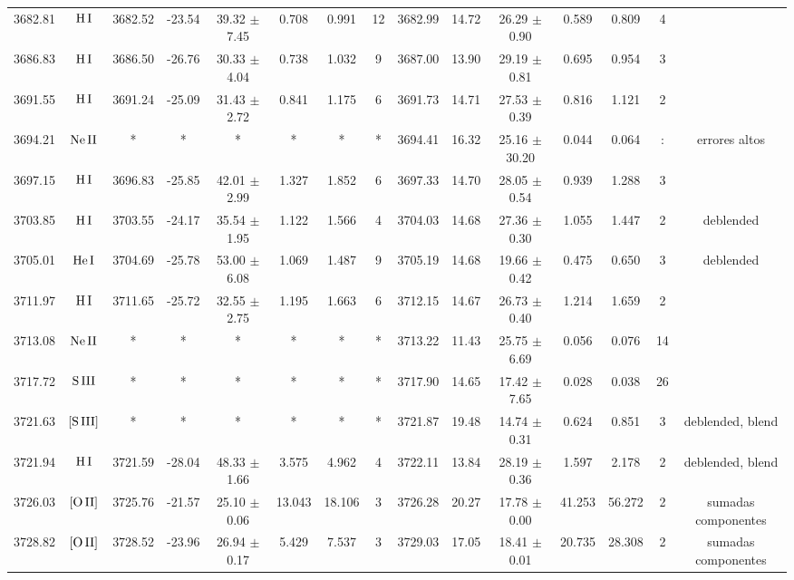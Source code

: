 \documentclass{article}
\begin{document}
\begin{table*}
\begin{adjustbox}{width=\textwidth}
\begin{tabular}{ccccccccccccccc}
3682.81 & $\mbox{H}\thinspace \mbox{I}$ & 3682.52 & -23.54 & 39.32 $\pm$ 7.45 & 0.708 & 0.991 & 12 & 3682.99 & 14.72 & 26.29 $\pm$ 0.90 & 0.589 & 0.809 & 4 &  \\
3686.83 & $\mbox{H}\thinspace \mbox{I}$ & 3686.50 & -26.76 & 30.33 $\pm$ 4.04 & 0.738 & 1.032 & 9 & 3687.00 & 13.90 & 29.19 $\pm$ 0.81 & 0.695 & 0.954 & 3 &  \\
3691.55 & $\mbox{H}\thinspace \mbox{I}$ & 3691.24 & -25.09 & 31.43 $\pm$ 2.72 & 0.841 & 1.175 & 6 & 3691.73 & 14.71 & 27.53 $\pm$ 0.39 & 0.816 & 1.121 & 2 &  \\
3694.21 & $\mbox{Ne}\thinspace \mbox{II}$ & * & * & * & * & * & * & 3694.41 & 16.32 & 25.16 $\pm$ 30.20 & 0.044 & 0.064 & : &  errores altos \\
3697.15 & $\mbox{H}\thinspace \mbox{I}$ & 3696.83 & -25.85 & 42.01 $\pm$ 2.99 & 1.327 & 1.852 & 6 & 3697.33 & 14.70 & 28.05 $\pm$ 0.54 & 0.939 & 1.288 & 3 &  \\
3703.85 & $\mbox{H}\thinspace \mbox{I}$ & 3703.55 & -24.17 & 35.54 $\pm$ 1.95 & 1.122 & 1.566 & 4 & 3704.03 & 14.68 & 27.36 $\pm$ 0.30 & 1.055 & 1.447 & 2 &  deblended \\
3705.01 & $\mbox{He}\thinspace \mbox{I}$ & 3704.69 & -25.78 & 53.00 $\pm$ 6.08 & 1.069 & 1.487 & 9 & 3705.19 & 14.68 & 19.66 $\pm$ 0.42 & 0.475 & 0.650 & 3 &  deblended \\
3711.97 & $\mbox{H}\thinspace \mbox{I}$ & 3711.65 & -25.72 & 32.55 $\pm$ 2.75 & 1.195 & 1.663 & 6 & 3712.15 & 14.67 & 26.73 $\pm$ 0.40 & 1.214 & 1.659 & 2 &  \\
3713.08 & $\mbox{Ne}\thinspace \mbox{II}$ & * & * & * & * & * & * & 3713.22 & 11.43 & 25.75 $\pm$ 6.69 & 0.056 & 0.076 & 14 &  \\
3717.72 & $\mbox{S}\thinspace \mbox{III}$ & * & * & * & * & * & * & 3717.90 & 14.65 & 17.42 $\pm$ 7.65 & 0.028 & 0.038 & 26 &  \\
3721.63 & $\mbox{[S}\thinspace \mbox{III]}$ & * & * & * & * & * & * & 3721.87 & 19.48 & 14.74 $\pm$ 0.31 & 0.624 & 0.851 & 3 &  deblended, blend \\
3721.94 & $\mbox{H}\thinspace \mbox{I}$ & 3721.59 & -28.04 & 48.33 $\pm$ 1.66 & 3.575 & 4.962 & 4 & 3722.11 & 13.84 & 28.19 $\pm$ 0.36 & 1.597 & 2.178 & 2 &  deblended, blend \\
3726.03 & $\mbox{[O}\thinspace \mbox{II]}$ & 3725.76 & -21.57 & 25.10 $\pm$ 0.06 & 13.043 & 18.106 & 3 & 3726.28 & 20.27 & 17.78 $\pm$ 0.00 & 41.253 & 56.272 & 2 &  sumadas componentes \\
3728.82 & $\mbox{[O}\thinspace \mbox{II]}$ & 3728.52 & -23.96 & 26.94 $\pm$ 0.17 & 5.429 & 7.537 & 3 & 3729.03 & 17.05 & 18.41 $\pm$ 0.01 & 20.735 & 28.308 & 2 &  sumadas componentes \\

\end{tabular}
\end{adjustbox}
\end{table*}
\end{document}
